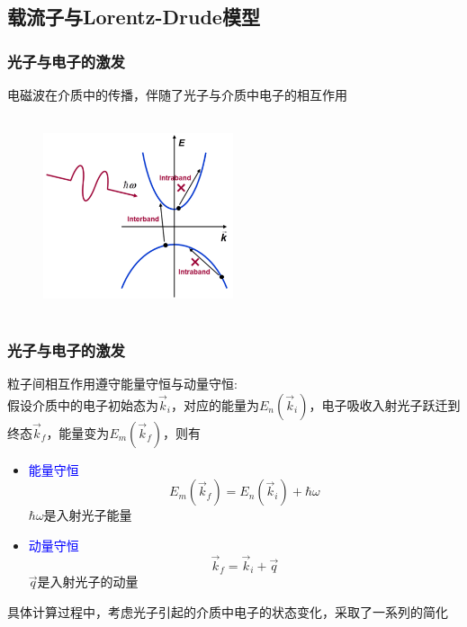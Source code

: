 {\subsection{载流子与\rm{Lorentz-Drude}模型}
\frame
{
	\frametitle{光子与电子的激发}
	电磁波在介质中的传播，伴随了光子与介质中电子的相互作用
\begin{figure}[h!]
\centering
\vspace*{-10pt}
\includegraphics[height=2.3in,width=2.2in,viewport=0 0 800 800,clip]{Figures/Inter-Intra_band-transition.png}
\caption{\fontsize{5.5pt}{4.2pt}}%
\label{Optic-transition}
\end{figure} 
}

\frame
{
	\frametitle{光子与电子的激发}
	粒子间相互作用遵守能量守恒与动量守恒:~\\
	假设介质中的电子初始态为$\vec k_i$，对应的能量为$E_n(\vec k_i)$，电子吸收入射光子跃迁到终态$\vec k_f$，能量变为$E_m(\vec k_f)$，则有
	\begin{itemize}
		\item \textcolor{blue}{能量守恒}
			\begin{displaymath}
				E_m(\vec k_f)=E_n(\vec k_i)+\hbar\omega
			\end{displaymath}
			$\hbar\omega$是入射光子能量
		\item \textcolor{blue}{动量守恒}
			\begin{displaymath}
				\vec k_f=\vec k_i+\vec q
			\end{displaymath}
			$\vec q$是入射光子的动量
	\end{itemize}
	具体计算过程中，考虑光子引起的介质中电子的状态变化，采取了一系列的简化
}

}

